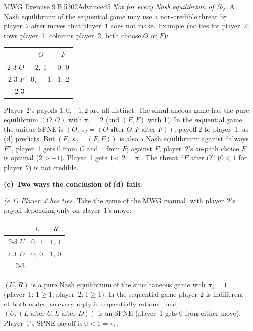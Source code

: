 \begin{exsol}{MWG Exercise 9.B.5}{302}{Advanced}{5}
\emph{Not for every Nash equilibrium of (b).} A Nash equilibrium of the sequential game may use a
non-credible threat by player~2 after moves that player~1 does not make. Example (no ties for
player~2; rows player~1, columns player~2, both choose $O$ or $F$):
\begin{center}
\begin{tabular}{r|c|c|}
\multicolumn{1}{r}{} & \multicolumn{1}{c}{$O$} & \multicolumn{1}{c}{$F$}\\ \cline{2-3}
$O$ & $2,\ 1$ & $0,\ 0$ \\ \cline{2-3}
$F$ & $0,\ -1$ & $1,\ 2$ \\ \cline{2-3}
\end{tabular}
\end{center}
Player~2's payoffs $1, 0, -1, 2$ are all distinct. The simultaneous game has the pure equilibrium
$(O, O)$ with $\pi_1 = 2$ (and $(F,F)$ with 1). In the sequential game the unique SPNE is
$(O,\ s_2 = (O \text{ after } O, F \text{ after } F))$, payoff 2 to player~1, as (d) predicts. But
$(F,\ s_2 = (F, F))$ is also a Nash equilibrium: against ``always $F$'', player~1 gets $0$ from $O$ and
$1$ from $F$; against $F$, player~2's on-path choice $F$ is optimal ($2 > -1$). Player~1 gets
$1 < 2 = \pi_1$. The threat ``$F$ after $O$'' ($0 < 1$ for player~2) is not credible.

\textbf{(e) Two ways the conclusion of (d) fails.}

\emph{(e.1) Player~2 has ties.} Take the game of the MWG manual, with player~2's payoff depending
only on player~1's move:
\begin{center}
\begin{tabular}{r|c|c|}
\multicolumn{1}{r}{} & \multicolumn{1}{c}{$L$} & \multicolumn{1}{c}{$R$}\\ \cline{2-3}
$U$ & $0,\ 1$ & $1,\ 1$ \\ \cline{2-3}
$D$ & $0,\ 0$ & $1,\ 0$ \\ \cline{2-3}
\end{tabular}
\end{center}
$(U, R)$ is a pure Nash equilibrium of the simultaneous game with $\pi_1 = 1$ (player~1: $1 \ge 1$;
player~2: $1 \ge 1$). In the sequential game player~2 is indifferent at both nodes, so every reply is
sequentially rational, and $(U, (L \text{ after } U, L \text{ after } D))$ is an SPNE (player~1 gets 0
from either move). Player~1's SPNE payoff is $0 < 1 = \pi_1$.


\end{exsol}
